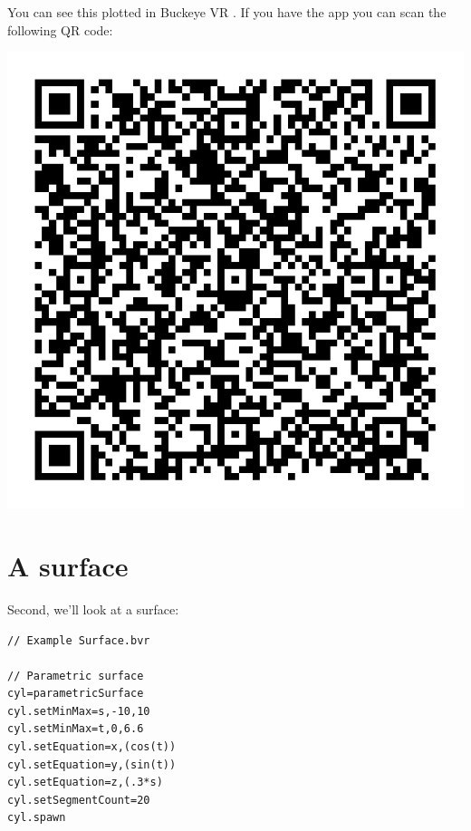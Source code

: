 \documentclass{ximera}
\begin{document}
You can see this plotted in Buckeye VR
.
If you have the app you can scan the following QR code:
\begin{image}
\includegraphics{bvrQR1.png}  
\end{image}



\section{A surface}

Second, we'll look at a surface:

\begin{verbatim}
// Example Surface.bvr

// Parametric surface
cyl=parametricSurface
cyl.setMinMax=s,-10,10
cyl.setMinMax=t,0,6.6
cyl.setEquation=x,(cos(t))
cyl.setEquation=y,(sin(t))
cyl.setEquation=z,(.3*s)
cyl.setSegmentCount=20
cyl.spawn
\end{verbatim}
\end{document}
